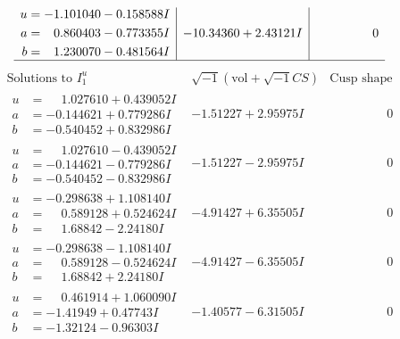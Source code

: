 \documentclass[1p]{elsarticle_modified}
\theoremstyle{definition}
\newcommand{\I}{\sqrt{-1}}
\begin{document}
$$\begin{array}{c|c|c}
\begin{aligned}
u &= -1.101040 - 0.158588 I \\
a &= \phantom{-}0.860403 - 0.773355 I \\
b &= \phantom{-}1.230070 - 0.481564 I\end{aligned}
 & -10.34360 + 2.43121 I & \phantom{-0.000000 } 0\\
 \hline 
 \end{array}$$\newpage$$\begin{array}{c|c|c}  
\text{Solutions to }I^u_{1}& \I (\text{vol} + \sqrt{-1}CS) & \text{Cusp shape}\\
 \hline 
\begin{aligned}
u &= \phantom{-}1.027610 + 0.439052 I \\
a &= -0.144621 + 0.779286 I \\
b &= -0.540452 + 0.832986 I\end{aligned}
 & -1.51227 + 2.95975 I & \phantom{-0.000000 } 0 \\ \hline\begin{aligned}
u &= \phantom{-}1.027610 - 0.439052 I \\
a &= -0.144621 - 0.779286 I \\
b &= -0.540452 - 0.832986 I\end{aligned}
 & -1.51227 - 2.95975 I & \phantom{-0.000000 } 0 \\ \hline\begin{aligned}
u &= -0.298638 + 1.108140 I \\
a &= \phantom{-}0.589128 + 0.524624 I \\
b &= \phantom{-}1.68842 - 2.24180 I\end{aligned}
 & -4.91427 + 6.35505 I & \phantom{-0.000000 } 0 \\ \hline\begin{aligned}
u &= -0.298638 - 1.108140 I \\
a &= \phantom{-}0.589128 - 0.524624 I \\
b &= \phantom{-}1.68842 + 2.24180 I\end{aligned}
 & -4.91427 - 6.35505 I & \phantom{-0.000000 } 0 \\ \hline\begin{aligned}
u &= \phantom{-}0.461914 + 1.060090 I \\
a &= -1.41949 + 0.47743 I \\
b &= -1.32124 - 0.96303 I\end{aligned}
 & -1.40577 - 6.31505 I & \phantom{-0.000000 } 0 \\ \hline\begin{aligned}

\end{aligned}
\end{array}$$
\end{document}
